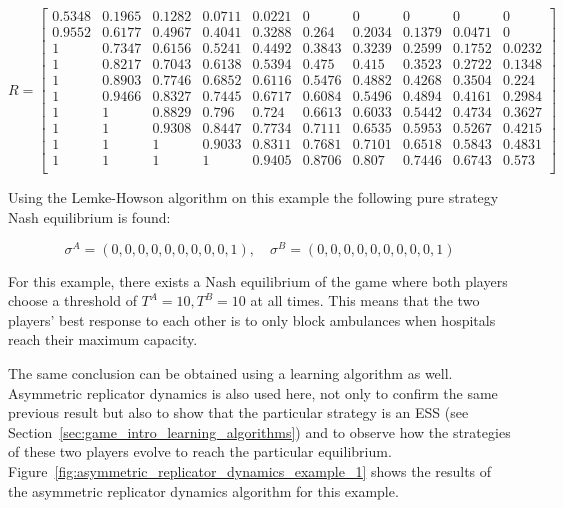 \begin{equation*}
    R = 
    \begin{bmatrix}
        0.5348 & 0.1965 & 0.1282 & 0.0711 & 0.0221 & 0      & 0      &
        0      & 0      & 0      \\
        0.9552 & 0.6177 & 0.4967 & 0.4041 & 0.3288 & 0.264  & 0.2034 &
        0.1379 & 0.0471 & 0      \\
        1      & 0.7347 & 0.6156 & 0.5241 & 0.4492 & 0.3843 & 0.3239 &
        0.2599 & 0.1752 & 0.0232 \\
        1      & 0.8217 & 0.7043 & 0.6138 & 0.5394 & 0.475  & 0.415  &
        0.3523 & 0.2722 & 0.1348 \\
        1      & 0.8903 & 0.7746 & 0.6852 & 0.6116 & 0.5476 & 0.4882 &
        0.4268 & 0.3504 & 0.224  \\
        1      & 0.9466 & 0.8327 & 0.7445 & 0.6717 & 0.6084 & 0.5496 &
        0.4894 & 0.4161 & 0.2984 \\
        1      & 1      & 0.8829 & 0.796  & 0.724  & 0.6613 & 0.6033 &
        0.5442 & 0.4734 & 0.3627 \\
        1      & 1      & 0.9308 & 0.8447 & 0.7734 & 0.7111 & 0.6535 &
        0.5953 & 0.5267 & 0.4215 \\
        1      & 1      & 1      & 0.9033 & 0.8311 & 0.7681 & 0.7101 &
        0.6518 & 0.5843 & 0.4831 \\
        1      & 1      & 1      & 1      & 0.9405 & 0.8706 & 0.807  &
        0.7446 & 0.6743 & 0.573  \\ 
    \end{bmatrix}
\end{equation*}
\normalsize

Using the Lemke-Howson algorithm on this example the following pure strategy
Nash equilibrium is found:

\begin{equation}
    \sigma^A = (0, 0, 0, 0, 0, 0, 0, 0, 0, 1), \quad
    \sigma^B = (0, 0, 0, 0, 0, 0, 0, 0, 0, 1)
\end{equation}

For this example, there exists a Nash equilibrium of the game where both 
players choose a threshold of \( T^A = 10, T^B = 10 \) at all times.
This means that the two players' best response to each other is to only block
ambulances when hospitals reach their maximum capacity.

The same conclusion can be obtained using a learning algorithm as well.
Asymmetric replicator dynamics is also used here, not only to confirm the same
previous result but also to show that the particular strategy is an ESS (see
Section~\ref{sec:game_intro_learning_algorithms}) and to observe how the
strategies of these two players evolve to reach the particular equilibrium.
Figure~\ref{fig:asymmetric_replicator_dynamics_example_1} shows the results
of the asymmetric replicator dynamics algorithm for this example.

